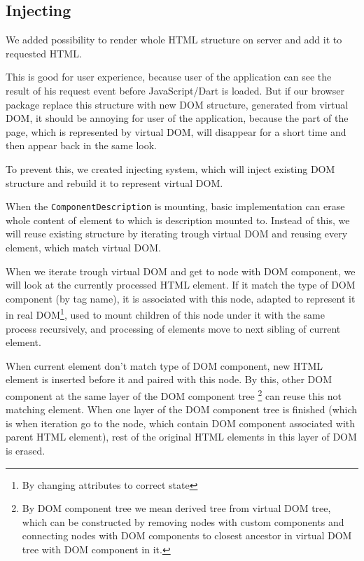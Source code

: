 \documentclass[oneside, 12pt]{book}
\begin{document}
  \subsection{Injecting}\label{subsec:our-architecture-injecting}

    We added possibility to render whole HTML structure on server and add it to requested HTML.

    This is good for user experience, because user of the application can see the result of his request event before JavaScript/Dart is loaded.
    But if our browser package replace this structure with new DOM structure, 
    generated from virtual DOM, it should be annoying for user of the application, because the part of the page, 
    which is represented by virtual DOM, will disappear for a short time and then appear back in the same look. 

    To prevent this, we created injecting system, which will inject existing DOM structure and rebuild it to represent virtual DOM.

    When the \texttt{ComponentDescription} is mounting, basic implementation can erase whole content of element to which is description mounted to.
    Instead of this, we will reuse existing structure by iterating trough virtual DOM and reusing every element, which match virtual DOM. 

    When we iterate trough virtual DOM and get to node with DOM component, we will look at the currently processed HTML element.
    If it match the type of DOM component (by tag name), 
    it is associated with this node, 
    adapted to represent it in real DOM\footnote{By changing attributes to correct state}, 
    used to mount children of this node under it with the same process recursively,
    and processing of elements move to next sibling of current element.

    When current element don't match type of DOM component, 
    new HTML element is inserted before it and paired with this node. 
    By this, other DOM component at the same layer of the DOM component tree
    \footnote{
      By DOM component tree we mean derived tree from virtual DOM tree, 
      which can be constructed by removing nodes with custom components
      and connecting nodes with DOM components to closest ancestor in virtual DOM tree with DOM component in it.
    }
    can reuse this not matching element.
    When one layer of the DOM component tree is finished
    (which is when iteration go to the node, which contain DOM component associated with parent HTML element),
    rest of the original HTML elements in this layer of DOM is erased. 
\end{document}
